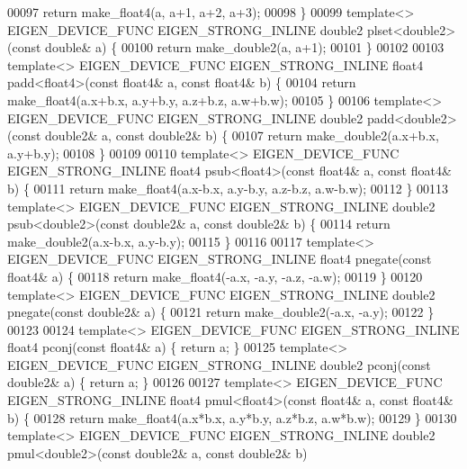 \begin{DoxyCode}
00097   \textcolor{keywordflow}{return} make\_float4(a, a+1, a+2, a+3);
00098 \}
00099 \textcolor{keyword}{template}<> EIGEN\_DEVICE\_FUNC EIGEN\_STRONG\_INLINE double2 plset<double2>(\textcolor{keyword}{const} \textcolor{keywordtype}{double}& a) \{
00100   \textcolor{keywordflow}{return} make\_double2(a, a+1);
00101 \}
00102 
00103 \textcolor{keyword}{template}<> EIGEN\_DEVICE\_FUNC EIGEN\_STRONG\_INLINE float4 padd<float4>(\textcolor{keyword}{const} float4& a, \textcolor{keyword}{const} float4& b) \{
00104   \textcolor{keywordflow}{return} make\_float4(a.x+b.x, a.y+b.y, a.z+b.z, a.w+b.w);
00105 \}
00106 \textcolor{keyword}{template}<> EIGEN\_DEVICE\_FUNC EIGEN\_STRONG\_INLINE double2 padd<double2>(\textcolor{keyword}{const} double2& a, \textcolor{keyword}{const} double2& b) 
      \{
00107   \textcolor{keywordflow}{return} make\_double2(a.x+b.x, a.y+b.y);
00108 \}
00109 
00110 \textcolor{keyword}{template}<> EIGEN\_DEVICE\_FUNC EIGEN\_STRONG\_INLINE float4 psub<float4>(\textcolor{keyword}{const} float4& a, \textcolor{keyword}{const} float4& b) \{
00111   \textcolor{keywordflow}{return} make\_float4(a.x-b.x, a.y-b.y, a.z-b.z, a.w-b.w);
00112 \}
00113 \textcolor{keyword}{template}<> EIGEN\_DEVICE\_FUNC EIGEN\_STRONG\_INLINE double2 psub<double2>(\textcolor{keyword}{const} double2& a, \textcolor{keyword}{const} double2& b) 
      \{
00114   \textcolor{keywordflow}{return} make\_double2(a.x-b.x, a.y-b.y);
00115 \}
00116 
00117 \textcolor{keyword}{template}<> EIGEN\_DEVICE\_FUNC EIGEN\_STRONG\_INLINE float4 pnegate(\textcolor{keyword}{const} float4& a) \{
00118   \textcolor{keywordflow}{return} make\_float4(-a.x, -a.y, -a.z, -a.w);
00119 \}
00120 \textcolor{keyword}{template}<> EIGEN\_DEVICE\_FUNC EIGEN\_STRONG\_INLINE double2 pnegate(\textcolor{keyword}{const} double2& a) \{
00121   \textcolor{keywordflow}{return} make\_double2(-a.x, -a.y);
00122 \}
00123 
00124 \textcolor{keyword}{template}<> EIGEN\_DEVICE\_FUNC EIGEN\_STRONG\_INLINE float4 pconj(\textcolor{keyword}{const} float4& a) \{ \textcolor{keywordflow}{return} a; \}
00125 \textcolor{keyword}{template}<> EIGEN\_DEVICE\_FUNC EIGEN\_STRONG\_INLINE double2 pconj(\textcolor{keyword}{const} double2& a) \{ \textcolor{keywordflow}{return} a; \}
00126 
00127 \textcolor{keyword}{template}<> EIGEN\_DEVICE\_FUNC EIGEN\_STRONG\_INLINE float4 pmul<float4>(\textcolor{keyword}{const} float4& a, \textcolor{keyword}{const} float4& b) \{
00128   \textcolor{keywordflow}{return} make\_float4(a.x*b.x, a.y*b.y, a.z*b.z, a.w*b.w);
00129 \}
00130 \textcolor{keyword}{template}<> EIGEN\_DEVICE\_FUNC EIGEN\_STRONG\_INLINE double2 pmul<double2>(\textcolor{keyword}{const} double2& a, \textcolor{keyword}{const} double2& b) 

\end{DoxyCode}
